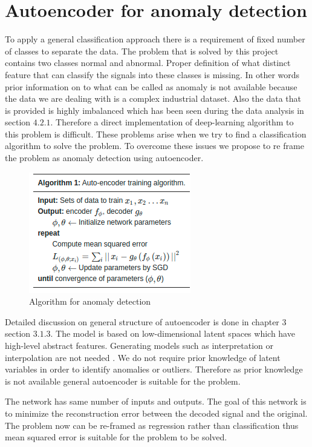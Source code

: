    \section{Autoencoder for anomaly detection}   
   To apply a general classification approach there is a requirement of fixed number of classes to separate the data. The problem that is solved by this project contains two classes normal and abnormal. Proper definition of what distinct feature that can classify the signals into these classes is missing. In other words prior information on to what can be called as anomaly is not available because the data we are dealing with is a complex industrial dataset.  Also the data that is provided is highly imbalanced which has been seen during the data analysis in section $4.2.1$. Therefore a direct implementation of deep-learning algorithm to this problem is difficult. These problems arise when we try to find a classification algorithm to solve the problem. To overcome these issues we propose to re frame the problem as anomaly detection using autoencoder.
   
    \begin{figure}[h]
    	\centering
    	\includegraphics[width=0.5\linewidth]{images/algau.png}
    	\caption{Algorithm for anomaly detection \cite{oh2018residual} }
    	\label{nv0}
    \end{figure}
   
   Detailed discussion on general structure of autoencoder is done in chapter 3 section $3.1.3$. The model is based on low-dimensional latent spaces which have high-level abstract features. Generating models such as interpretation or interpolation are not needed \cite{oh2018residual}. We do not require prior knowledge of latent variables in order to identify anomalies or outliers. Therefore as prior knowledge is not available general autoencoder is suitable for the problem.
   
   The network has same number of inputs and outputs. The goal of this network is to minimize the reconstruction error between the decoded signal and the original. The problem now can be re-framed as regression rather than classification thus mean squared error is suitable for the problem to be solved. 
   
